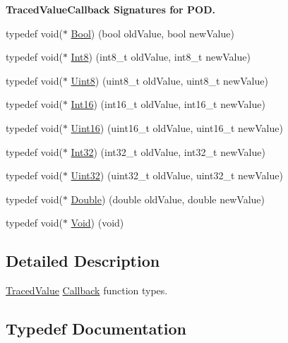 \begin{Indent}{\bf Traced\+Value\+Callback Signatures for P\+OD.}\par
\begin{DoxyCompactItemize}
\item 
typedef void($\ast$ \hyperlink{namespacens3_1_1TracedValueCallback_a3761efe7d95bb03411e1f3a97801b83a}{Bool}) (bool old\+Value, bool new\+Value)
\item 
typedef void($\ast$ \hyperlink{namespacens3_1_1TracedValueCallback_a2fb8cf64394b8b31d0371efc3ca9fd32}{Int8}) (int8\+\_\+t old\+Value, int8\+\_\+t new\+Value)
\item 
typedef void($\ast$ \hyperlink{namespacens3_1_1TracedValueCallback_afe3b1b129457374bd27c782da6d3583f}{Uint8}) (uint8\+\_\+t old\+Value, uint8\+\_\+t new\+Value)
\item 
typedef void($\ast$ \hyperlink{namespacens3_1_1TracedValueCallback_ac7c118b3f2535cf3b6a24b0378e164ec}{Int16}) (int16\+\_\+t old\+Value, int16\+\_\+t new\+Value)
\item 
typedef void($\ast$ \hyperlink{namespacens3_1_1TracedValueCallback_a0966dfa38c6729766c3e68f8a3996b41}{Uint16}) (uint16\+\_\+t old\+Value, uint16\+\_\+t new\+Value)
\item 
typedef void($\ast$ \hyperlink{namespacens3_1_1TracedValueCallback_a1845ec78343b2fd1bdc81085681f20eb}{Int32}) (int32\+\_\+t old\+Value, int32\+\_\+t new\+Value)
\item 
typedef void($\ast$ \hyperlink{namespacens3_1_1TracedValueCallback_a7a8acb7551dcca7b77b7488bbe00b042}{Uint32}) (uint32\+\_\+t old\+Value, uint32\+\_\+t new\+Value)
\item 
typedef void($\ast$ \hyperlink{namespacens3_1_1TracedValueCallback_a20db2298d43cb2d3b673f706fbc20037}{Double}) (double old\+Value, double new\+Value)
\item 
typedef void($\ast$ \hyperlink{namespacens3_1_1TracedValueCallback_aa63613617d4ddb8f016ed0edb0300270}{Void}) (void)
\end{DoxyCompactItemize}
\end{Indent}


\subsection{Detailed Description}
\hyperlink{classns3_1_1TracedValue}{Traced\+Value} \hyperlink{classns3_1_1Callback}{Callback} function types. 

\subsection{Typedef Documentation}
